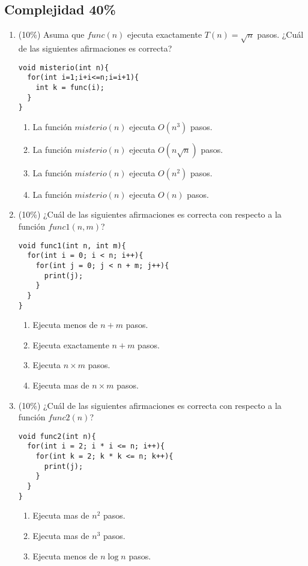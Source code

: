 \documentclass[10 pt]{article}
\begin{document}
\begin{multicols}{2}
\section{Complejidad 40\%}
\begin{enumerate}[label=(\alph*)]
\item (10\%) Asuma que $func(n)$ ejecuta exactamente $T(n) = \sqrt{n}$ pasos. ¿Cuál de las siguientes afirmaciones es correcta?
\begin{lstlisting}
void misterio(int n){
  for(int i=1;i+i<=n;i=i+1){
    int k = func(i);  
  }
}
\end{lstlisting}
\begin{enumerate}[label=(\roman*)]
\item La función $misterio(n)$ ejecuta $O(n^3)$ pasos.
\item La función $misterio(n)$ ejecuta $O(n \sqrt{n})$ pasos.
\item La función $misterio(n)$ ejecuta $O(n^2)$ pasos.
\item La función $misterio(n)$ ejecuta $O(n)$ pasos.
\end{enumerate}
\item (10\%) ¿Cuál de las siguientes afirmaciones es correcta con respecto a la función $func1(n, m)$?
\begin{lstlisting}
void func1(int n, int m){
  for(int i = 0; i < n; i++){
    for(int j = 0; j < n + m; j++){
      print(j);
    }  
  }
}
\end{lstlisting}
\begin{enumerate}[label=(\roman*)]
\item Ejecuta menos de $n + m$ pasos.
\item Ejecuta exactamente $n + m$ pasos.
\item Ejecuta $n \times m$ pasos.
\item Ejecuta mas de $n \times m$ pasos.
\end{enumerate}
\item (10\%) ¿Cuál de las siguientes afirmaciones es correcta con respecto a la función $func2(n)$?
\begin{lstlisting}
void func2(int n){
  for(int i = 2; i * i <= n; i++){
    for(int k = 2; k * k <= n; k++){
      print(j);
    }  
  }
}
\end{lstlisting}
\begin{enumerate}[label=(\roman*)]
\item Ejecuta mas de $n ^ 2$ pasos.
\item Ejecuta mas de $n ^ 3$ pasos.
\item Ejecuta menos de $n \log n$ pasos.

\end{enumerate}
\end{enumerate}
\end{multicols}
\end{document}
